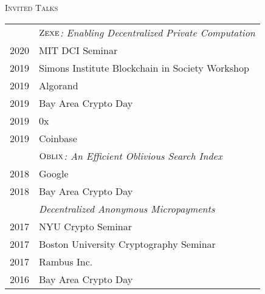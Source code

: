 \documentclass[11pt]{article}
\newenvironment{SectionTableSingleSpace}[1]{
	\renewcommand*{\arraystretch}{1.2}
	\setlength{\tabcolsep}{6pt}
  {\Large \textsc{#1}}
	\begin{longtable}{Rp{5.4in}}}
{\end{longtable}\vspace{-0.2cm}}
\begin{document}
\begin{cv}{\vspace{-5em}}
\begin{SectionTableSingleSpace}{Invited Talks}
    
    & \emph{$\textsc{Zexe}$: Enabling Decentralized Private Computation} \\
      2020 & MIT DCI Seminar \\
      2019 & Simons Institute Blockchain in Society Workshop \\
      2019 & Algorand \\
      2019 & Bay Area Crypto Day \\
      2019 & 0x \\
      2019 & Coinbase \\[0.4em]

    & \emph{$\textsc{Oblix}$: An Efficient Oblivious Search Index} \\
      2018 & Google \\
      2018 & Bay Area Crypto Day \\[0.4em]
      
      
    & \emph{Decentralized Anonymous Micropayments} \\
      2017 & NYU Crypto Seminar \\
      2017 & Boston University Cryptography Seminar \\
      2017 & Rambus Inc. \\
      2016 & Bay Area Crypto Day 
    

    


\end{SectionTableSingleSpace}
\end{cv}
\end{document}
